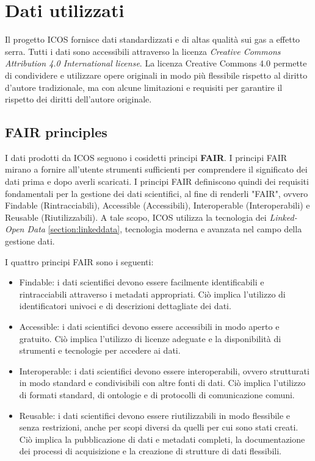\chapter{Dati utilizzati}
\label{chap:dati}

Il progetto ICOS fornisce dati standardizzati e di altas qualità sui gas a effetto serra.
Tutti i dati sono accessibili attraverso la licenza \textit{Creative Commons Attribution 4.0 International license}.
La licenza Creative Commons 4.0 permette di condividere e utilizzare opere originali in modo più flessibile rispetto
al diritto d'autore tradizionale, ma con alcune limitazioni e requisiti per garantire il rispetto dei diritti dell'autore originale.

\section{FAIR principles}
\label{section:fair}
I dati prodotti da ICOS seguono i cosidetti principi \textbf{FAIR}.
I principi FAIR mirano a fornire all'utente strumenti sufficienti per 
comprendere il significato dei dati prima e dopo averli scaricati. 
I principi FAIR definiscono quindi dei requisiti fondamentali per
la gestione dei dati scientifici, al fine di renderli "FAIR",
ovvero Findable (Rintracciabili), Accessible (Accessibili), Interoperable (Interoperabili) e 
Reusable (Riutilizzabili). A tale scopo, ICOS utilizza la tecnologia dei \textit{Linked-Open Data} \ref{section:linkeddata},
tecnologia moderna e avanzata nel campo della gestione dati. 

I quattro principi FAIR sono i seguenti:

\begin{itemize}
    \item Findable: i dati scientifici devono essere facilmente identificabili e rintracciabili attraverso i metadati appropriati.
    Ciò implica l'utilizzo di identificatori univoci e di descrizioni dettagliate dei dati.
    \item Accessible: i dati scientifici devono essere accessibili in modo aperto e gratuito.
    Ciò implica l'utilizzo di licenze adeguate e la disponibilità di strumenti e tecnologie per accedere ai dati.
    \item Interoperable: i dati scientifici devono essere interoperabili, ovvero strutturati in modo standard
    e condivisibili con altre fonti di dati. Ciò implica l'utilizzo di formati standard, di ontologie e di protocolli
    di comunicazione comuni.
    \item Reusable: i dati scientifici devono essere riutilizzabili
    in modo flessibile e senza restrizioni, anche per scopi diversi da quelli
    per cui sono stati creati. Ciò implica la pubblicazione di dati e metadati completi,
    la documentazione dei processi di acquisizione e la creazione di strutture di dati flessibili.
\end{itemize}



